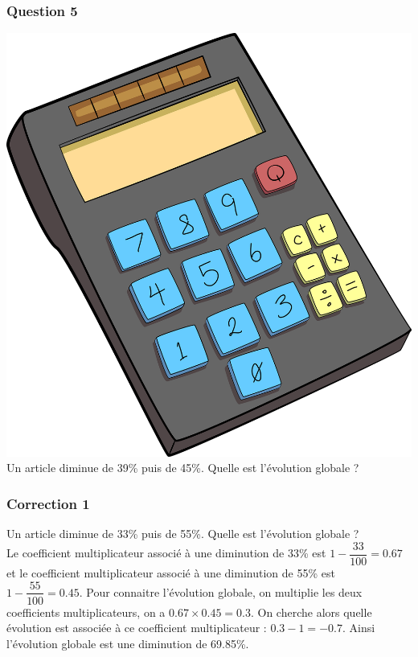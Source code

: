 \documentclass[15pt, mathserif]{beamer}
\begin{document}
\begin{frame} 
	\frametitle{Question 5}
\includegraphics[scale=0.01]{calculatrice} Un article diminue de 39\% puis de 45\%. Quelle est l'évolution globale ?\end{frame}


\begin{frame}
\vspace{-10mm}
	\frametitle{Correction 1}
\vspace*{1cm} Un article diminue de 33\% puis de 55\%. Quelle est l'évolution globale ? \\ Le coefficient multiplicateur associé à une diminution de 33\% est $1-\dfrac{33}{100} = 0.67$ et le coefficient multiplicateur associé à une diminution de 55\% est $1-\dfrac{55}{100} = 0.45$. Pour connaitre l'évolution globale, on multiplie les deux coefficients multiplicateurs, on a $ 0.67 \times 0.45=0.3$. On cherche alors quelle évolution est associée à ce coefficient multiplicateur : $0.3-1 =-0.7$. Ainsi l'évolution globale est une diminution de 69.85\%. 
 \begin{center} 
 \end{center}\end{frame}
\end{document}
